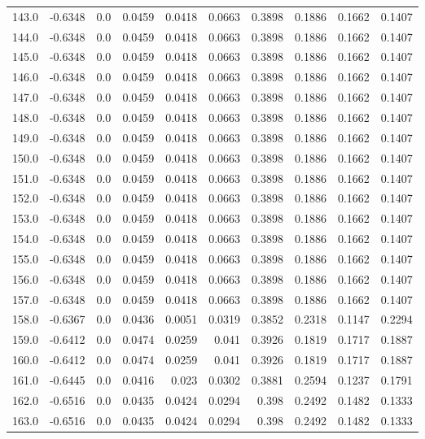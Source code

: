 \begin{longtable}{lrrrrrrrrr}
143.0 & -0.6348 & 0.0 & 0.0459 & 0.0418 & 0.0663 & 0.3898 & 0.1886 & 0.1662 & 0.1407 \\
144.0 & -0.6348 & 0.0 & 0.0459 & 0.0418 & 0.0663 & 0.3898 & 0.1886 & 0.1662 & 0.1407 \\
145.0 & -0.6348 & 0.0 & 0.0459 & 0.0418 & 0.0663 & 0.3898 & 0.1886 & 0.1662 & 0.1407 \\
146.0 & -0.6348 & 0.0 & 0.0459 & 0.0418 & 0.0663 & 0.3898 & 0.1886 & 0.1662 & 0.1407 \\
147.0 & -0.6348 & 0.0 & 0.0459 & 0.0418 & 0.0663 & 0.3898 & 0.1886 & 0.1662 & 0.1407 \\
148.0 & -0.6348 & 0.0 & 0.0459 & 0.0418 & 0.0663 & 0.3898 & 0.1886 & 0.1662 & 0.1407 \\
149.0 & -0.6348 & 0.0 & 0.0459 & 0.0418 & 0.0663 & 0.3898 & 0.1886 & 0.1662 & 0.1407 \\
150.0 & -0.6348 & 0.0 & 0.0459 & 0.0418 & 0.0663 & 0.3898 & 0.1886 & 0.1662 & 0.1407 \\
151.0 & -0.6348 & 0.0 & 0.0459 & 0.0418 & 0.0663 & 0.3898 & 0.1886 & 0.1662 & 0.1407 \\
152.0 & -0.6348 & 0.0 & 0.0459 & 0.0418 & 0.0663 & 0.3898 & 0.1886 & 0.1662 & 0.1407 \\
153.0 & -0.6348 & 0.0 & 0.0459 & 0.0418 & 0.0663 & 0.3898 & 0.1886 & 0.1662 & 0.1407 \\
154.0 & -0.6348 & 0.0 & 0.0459 & 0.0418 & 0.0663 & 0.3898 & 0.1886 & 0.1662 & 0.1407 \\
155.0 & -0.6348 & 0.0 & 0.0459 & 0.0418 & 0.0663 & 0.3898 & 0.1886 & 0.1662 & 0.1407 \\
156.0 & -0.6348 & 0.0 & 0.0459 & 0.0418 & 0.0663 & 0.3898 & 0.1886 & 0.1662 & 0.1407 \\
157.0 & -0.6348 & 0.0 & 0.0459 & 0.0418 & 0.0663 & 0.3898 & 0.1886 & 0.1662 & 0.1407 \\
158.0 & -0.6367 & 0.0 & 0.0436 & 0.0051 & 0.0319 & 0.3852 & 0.2318 & 0.1147 & 0.2294 \\
159.0 & -0.6412 & 0.0 & 0.0474 & 0.0259 & 0.041 & 0.3926 & 0.1819 & 0.1717 & 0.1887 \\
160.0 & -0.6412 & 0.0 & 0.0474 & 0.0259 & 0.041 & 0.3926 & 0.1819 & 0.1717 & 0.1887 \\
161.0 & -0.6445 & 0.0 & 0.0416 & 0.023 & 0.0302 & 0.3881 & 0.2594 & 0.1237 & 0.1791 \\
162.0 & -0.6516 & 0.0 & 0.0435 & 0.0424 & 0.0294 & 0.398 & 0.2492 & 0.1482 & 0.1333 \\
163.0 & -0.6516 & 0.0 & 0.0435 & 0.0424 & 0.0294 & 0.398 & 0.2492 & 0.1482 & 0.1333 \\

\end{longtable}
